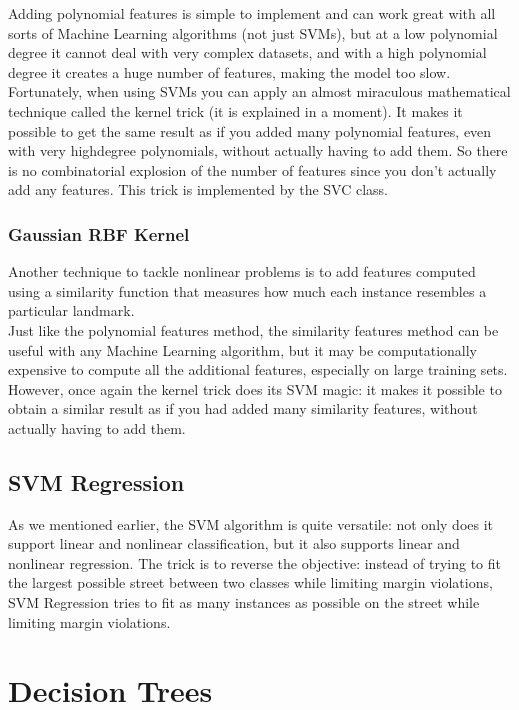 \documentclass[french]{article}
\begin{document}
Adding polynomial features is simple to implement and can work great with all sorts of Machine Learning algorithms (not just SVMs), but at a low polynomial degree it cannot deal with very complex datasets, and with a high polynomial degree it creates a huge number of features, making the model too slow. \\

Fortunately, when using SVMs you can apply an almost miraculous mathematical technique called the kernel trick (it is explained in a moment). It makes it possible to get the same result as if you added many polynomial features, even with very highdegree polynomials, without actually having to add them. So there is no combinatorial explosion of the number of features since you don’t actually add any features. This trick is implemented by the SVC class.

\subsubsection{Gaussian RBF Kernel}

Another technique to tackle nonlinear problems is to add features computed using a similarity function that measures how much each instance resembles a particular landmark. \\

Just like the polynomial features method, the similarity features method can be useful with any Machine Learning algorithm, but it may be computationally expensive to compute all the additional features, especially on large training sets. However, once again the kernel trick does its SVM magic: it makes it possible to obtain a similar result as if you had added many similarity features, without actually having to add them.

\subsection{SVM Regression}

As we mentioned earlier, the SVM algorithm is quite versatile: not only does it support linear and nonlinear classification, but it also supports linear and nonlinear regression. The trick is to reverse the objective: instead of trying to fit the largest possible street between two classes while limiting margin violations, SVM Regression tries to fit as many instances as possible on the street while limiting margin violations.

\section{Decision Trees}
\end{document}
